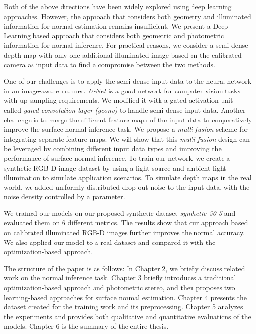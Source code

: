 Both of the above directions have been widely explored using deep learning approaches. However, the approach that considers both geometry and illuminated information for normal estimation remains insufficient. We present a Deep Learning based approach that considers both geometric and photometric information for normal inference. For practical reasons, we consider a semi-dense depth map with only one additional illuminated image based on the calibrated camera as input data to find a compromise between the two methods. 

One of our challenges is to apply the semi-dense input data to the neural network in an image-aware manner. \textit{U-Net} is a good network for computer vision tasks with up-sampling requirements. We modified it with a gated activation unit called \textit{gated convolution layer (gconv)} to handle semi-dense input data. Another challenge is to merge the different feature maps of the input data to cooperatively improve the surface normal inference task. We propose a \textit{multi-fusion} scheme for integrating separate feature maps. We will show that this \textit{multi-fusion} design can be leveraged by combining different input data types and improving the performance of surface normal inference. To train our network, we create a synthetic RGB-D image dataset by using a light source and ambient light illumination to simulate application scenarios. To simulate depth maps in the real world, we added uniformly distributed drop-out noise to the input data, with the noise density controlled by a parameter.

We trained our models on our proposed synthetic dataset \textit{synthetic-50-5} and evaluated them on 6 different metrics. The results show that our approach based on calibrated illuminated RGB-D images further improves the normal accuracy. We also applied our model to a real dataset and compared it with the optimization-based approach.


The structure of the paper is as follows: In Chapter 2, we briefly discuss related work on the normal inference task. Chapter 3 briefly introduces a traditional optimization-based approach and photometric stereo, and then proposes two learning-based approaches for surface normal estimation. Chapter 4 presents the dataset created for the training work and its preprocessing. Chapter 5 analyzes the experiments and provides both qualitative and quantitative evaluations of the models. Chapter 6 is the summary of the entire thesis.
